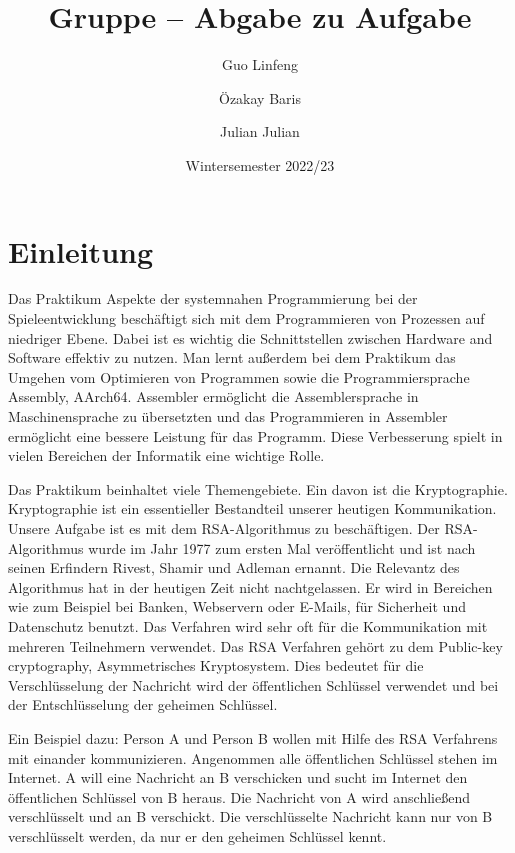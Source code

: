\documentclass[course=asp]{aspdoc}
\author{Guo Linfeng \and Özakay Baris \and Julian Julian}
\date{Wintersemester 2022/23} %
\title{Gruppe \theGroup{} -- Abgabe zu Aufgabe \theNumber}
\begin{document}
\maketitle

\section{Einleitung}
Das Praktikum Aspekte der systemnahen Programmierung bei der Spieleentwicklung beschäftigt sich mit dem Programmieren von Prozessen auf niedriger Ebene. Dabei ist es wichtig die Schnittstellen zwischen Hardware and Software effektiv zu nutzen. Man lernt außerdem bei dem Praktikum das Umgehen vom Optimieren von Programmen sowie die Programmiersprache Assembly, AArch64. Assembler ermöglicht die Assemblersprache in Maschinensprache zu übersetzten und das Programmieren in Assembler ermöglicht eine bessere Leistung für das Programm. Diese Verbesserung spielt in vielen Bereichen der Informatik eine wichtige Rolle.

Das Praktikum beinhaltet viele Themengebiete. Ein davon ist die Kryptographie. Kryptographie ist ein essentieller Bestandteil unserer heutigen Kommunikation. Unsere Aufgabe ist es mit dem RSA-Algorithmus zu beschäftigen. Der RSA-Algorithmus wurde im Jahr 1977 zum ersten Mal veröffentlicht und ist nach seinen Erfindern Rivest, Shamir und Adleman ernannt. Die Relevantz des Algorithmus hat in der heutigen Zeit nicht nachtgelassen. Er wird in Bereichen wie zum Beispiel bei Banken, Webservern oder E-Mails, für Sicherheit und Datenschutz benutzt. Das Verfahren wird sehr oft für die Kommunikation mit mehreren Teilnehmern verwendet. Das RSA Verfahren gehört zu dem Public-key cryptography, Asymmetrisches Kryptosystem. Dies bedeutet für die Verschlüsselung der Nachricht wird der öffentlichen Schlüssel verwendet und bei der Entschlüsselung der geheimen Schlüssel. 

Ein Beispiel dazu: Person A und Person B wollen mit Hilfe des RSA Verfahrens mit einander kommunizieren. Angenommen alle öffentlichen Schlüssel stehen im Internet. A will eine Nachricht an B verschicken und sucht im Internet den öffentlichen Schlüssel von B heraus. Die Nachricht von A wird anschließend verschlüsselt und an B verschickt. Die verschlüsselte Nachricht kann nur von B verschlüsselt werden, da nur er den geheimen Schlüssel kennt. 
 
\end{document}
